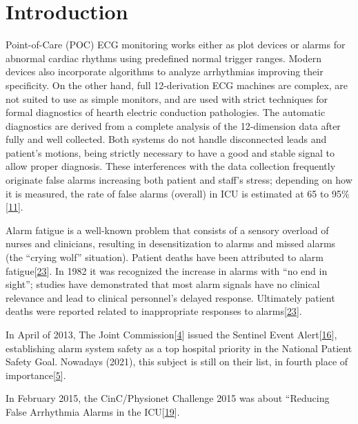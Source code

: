 \documentclass[runningheads]{llncs}
\begin{document}
\hypertarget{introduction}{%
\section{Introduction}\label{introduction}}

Point-of-Care (POC) ECG monitoring works either as plot devices or
alarms for abnormal cardiac rhythms using predefined normal trigger
ranges. Modern devices also incorporate algorithms to analyze
arrhythmias improving their specificity. On the other hand, full
12-derivation ECG machines are complex, are not suited to use as simple
monitors, and are used with strict techniques for formal diagnostics of
hearth electric conduction pathologies. The automatic diagnostics are
derived from a complete analysis of the 12-dimension data after fully
and well collected. Both systems do not handle disconnected leads and
patient's motions, being strictly necessary to have a good and stable
signal to allow proper diagnosis. These interferences with the data
collection frequently originate false alarms increasing both patient and
staff's stress; depending on how it is measured, the rate of false
alarms (overall) in ICU is estimated at 65 to
95\%{[}\protect\hyperlink{ref-donchin2002}{11}{]}.

Alarm fatigue is a well-known problem that consists of a sensory
overload of nurses and clinicians, resulting in desensitization to
alarms and missed alarms (the ``crying wolf'' situation). Patient deaths
have been attributed to alarm
fatigue{[}\protect\hyperlink{ref-sendelbach2013}{23}{]}. In 1982 it was
recognized the increase in alarms with ``no end in sight''; studies have
demonstrated that most alarm signals have no clinical relevance and lead
to clinical personnel's delayed response. Ultimately patient deaths were
reported related to inappropriate responses to
alarms{[}\protect\hyperlink{ref-sendelbach2013}{23}{]}.

In April of 2013, The Joint
Commission{[}\protect\hyperlink{ref-the_jc}{4}{]} issued the Sentinel
Event Alert{[}\protect\hyperlink{ref-JointCommission2013}{16}{]},
establishing alarm system safety as a top hospital priority in the
National Patient Safety Goal. Nowadays (2021), this subject is still on
their list, in fourth place of
importance{[}\protect\hyperlink{ref-the_jc2021}{5}{]}.

In February 2015, the CinC/Physionet Challenge 2015 was about ``Reducing
False Arrhythmia Alarms in the
ICU{[}\protect\hyperlink{ref-Lawless1994}{19}{]}.
\end{document}
